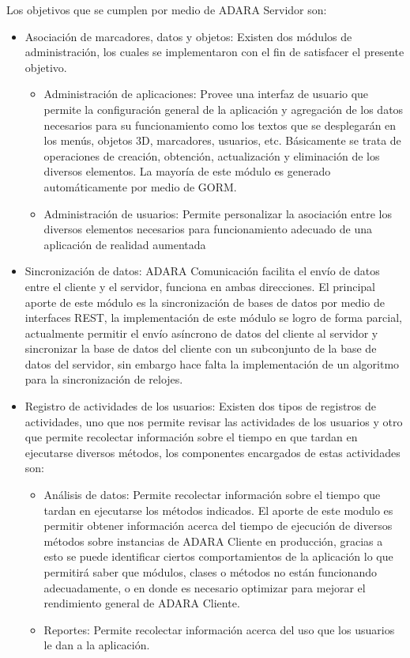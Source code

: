 \documentclass[12pt,a4paper,spanish,openany]{book}
\begin{document}
Los objetivos que se cumplen por medio de ADARA Servidor son:
\begin{itemize}
  \item Asociación de marcadores, datos y objetos: Existen dos módulos de
  administración, los cuales se implementaron con el fin de satisfacer el
  presente objetivo.
    \begin{itemize}
        \item Administración de aplicaciones: Provee una interfaz de usuario que
        permite la configuración general de la aplicación y
        agregación de los datos necesarios para su funcionamiento como los textos que se desplegarán en
        los menús, objetos 3D, marcadores, usuarios, etc. Básicamente se trata
        de operaciones de creación, obtención, actualización y eliminación de
        los diversos elementos. La mayoría de este módulo es generado
        automáticamente por medio de GORM.
        \item Administración de usuarios: Permite personalizar la asociación
        entre los diversos elementos necesarios para funcionamiento adecuado de
        una aplicación de realidad aumentada
    \end{itemize}  
  \item Sincronización de datos: ADARA Comunicación facilita el envío de datos
  entre el cliente y el servidor, funciona en ambas direcciones. El principal
  aporte de este módulo es la sincronización de bases de datos por medio de
  interfaces REST, la implementación de este módulo se logro de forma
  parcial, actualmente permitir el envío asíncrono de datos del cliente al
  servidor y sincronizar la base de datos del cliente con un
  subconjunto de la base de datos del servidor, sin embargo hace falta la
  implementación de un algoritmo para la sincronización de relojes.
 
  \item Registro de actividades de los usuarios: Existen dos tipos de registros
  de actividades, uno que nos permite revisar las actividades de los usuarios y
  otro que permite recolectar información sobre el tiempo en que tardan en
  ejecutarse diversos métodos, los componentes encargados de estas actividades
  son:
    \begin{itemize}
        \item Análisis de datos: Permite recolectar información sobre el tiempo
        que tardan en ejecutarse los métodos indicados. El aporte de este modulo
        es permitir obtener información acerca del tiempo de ejecución de
        diversos métodos sobre instancias de ADARA Cliente en producción,
        gracias a esto se puede identificar ciertos comportamientos de la
        aplicación lo que permitirá saber que módulos, clases o métodos no están
        funcionando adecuadamente, o en donde es necesario optimizar para
        mejorar el rendimiento general de ADARA Cliente.
        \item Reportes: Permite recolectar información acerca del uso que
        los usuarios le dan a la aplicación.
    \end{itemize}  
\end{itemize}
\end{document}
